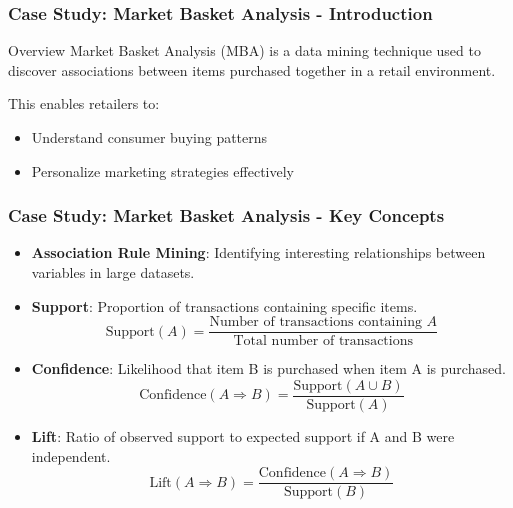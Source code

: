 \documentclass[aspectratio=169]{beamer}
\begin{document}
\begin{frame}[fragile]
    \frametitle{Case Study: Market Basket Analysis - Introduction}
    \begin{block}{Overview}
        Market Basket Analysis (MBA) is a data mining technique used to discover associations between items purchased together in a retail environment.

        This enables retailers to:
        \begin{itemize}
            \item Understand consumer buying patterns
            \item Personalize marketing strategies effectively
        \end{itemize}
    \end{block}
\end{frame}

\begin{frame}[fragile]
    \frametitle{Case Study: Market Basket Analysis - Key Concepts}
    \begin{itemize}
        \item \textbf{Association Rule Mining}: Identifying interesting relationships between variables in large datasets.
        \item \textbf{Support}: Proportion of transactions containing specific items.
        \begin{equation}
            \text{Support}(A) = \frac{\text{Number of transactions containing } A}{\text{Total number of transactions}}
        \end{equation}
        \item \textbf{Confidence}: Likelihood that item B is purchased when item A is purchased.
        \begin{equation}
            \text{Confidence}(A \Rightarrow B) = \frac{\text{Support}(A \cup B)}{\text{Support}(A)}
        \end{equation}
        \item \textbf{Lift}: Ratio of observed support to expected support if A and B were independent.
        \begin{equation}
            \text{Lift}(A \Rightarrow B) = \frac{\text{Confidence}(A \Rightarrow B)}{\text{Support}(B)}
        \end{equation}
    \end{itemize}
\end{frame}
\end{document}
